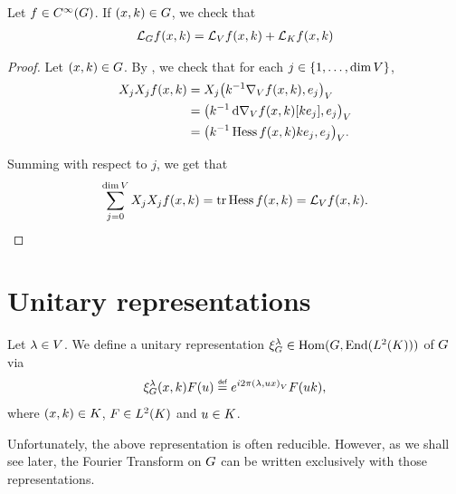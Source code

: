 \begin{proposition}
    Let $f \in \SmoothFunctions\Group$.
    If $(x, k) \in \Group$, we check that
    \begin{align*}
        \Laplacian f(x, k) = \Laplacian[\VectorSpace] f(x, k) + \Laplacian[\CompactGroup] f(x, k)
    \end{align*}
\end{proposition}
\begin{proof}
    Let $(x, k) \in \Group$.
    By ,
    we check that for each $j \in \{1, \dots, \dim \VectorSpace\}$,
    \begin{align*}
        \LeftDifferentialOperatorFirstOrder{X_j} \LeftDifferentialOperatorFirstOrder{X_j} f(x, k)
        &= \LeftDifferentialOperatorFirstOrder{X_j} \ip{k^{-1} \grad f(x, k)}{e_j}\\
        &= \ip{k^{-1} \dd \grad f(x, k)[k e_j]}{e_j}\\
        &= \ip{k^{-1} \Hessian f(x, k) k e_j}{e_j}.
    \end{align*}

    Summing with respect to $j$, we get that
    \begin{align*}
        \sum_{j = 0}^{\dim \VectorSpace} \LeftDifferentialOperatorFirstOrder{X_j} \LeftDifferentialOperatorFirstOrder{X_j} f(x, k)
        = \tr \Hessian f(x, k) = \Laplacian[\VectorSpace] f(x, k).
    \end{align*}
\end{proof}

\section{Unitary representations}

\begin{definition}
\label{definition:reducible_representation}
    Let $\lambda \in \VectorSpace$.
    We define a unitary representation $\Rep{\lambda} \in \Hom(\Group, \End(\Lebesgue{2}{\CompactGroup}))$ of $\Group$ via
    \begin{align}
        \Rep{\lambda} (x, k) F(u) \defeq \e^{\i \turn \ip \lambda {u x}} F(u k),
        \label{eq:reducible_representations_on_the_motion_groups}
    \end{align}
    where $(x, k) \in \CompactGroup$, $F \in \Lebesgue{2}{\CompactGroup}$ and $u \in \CompactGroup$.
\end{definition}

Unfortunately, the above representation is often reducible.
However, as we shall see later, the Fourier Transform on $\Group$ can be written exclusively with those representations.

